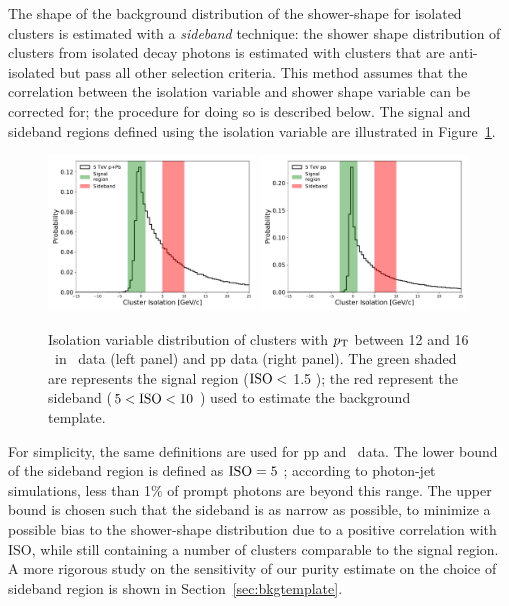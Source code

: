 The shape of the background distribution of the shower-shape for isolated clusters is estimated with a \textit{sideband} technique: the shower shape distribution of clusters from isolated decay photons is estimated with clusters that are anti-isolated but pass all other selection criteria. This method assumes that the correlation between the isolation variable and shower shape variable can be corrected for; the procedure for doing so is described below. The signal and sideband regions defined using the isolation variable are illustrated in Figure~\ref{SidebandDefinition}. 

\begin{figure}[hbtp]
\center
\includegraphics[width=0.49\textwidth]{Data_Analysis/Purity/IsolationSideband_limited_Skimmed_13def_root}
\includegraphics[width=0.49\textwidth]{Data_Analysis/Purity/IsolationSideband_limited_Skimmed_17q_root}
\caption{Isolation variable distribution of clusters with $p_{\mathrm{T}}$ between 12 and 16 \GeVc~in \pPb~data (left panel) and pp data (right panel). The green shaded are represents the signal region ($\mathrm{ISO}<$ 1.5 \GeVc); the red represent the sideband ($5<\mathrm{ISO}<10$ \GeVc) used to estimate the background template.}
\label{SidebandDefinition}
\end{figure}

For simplicity, the same definitions are used for pp and \pPb~data. The lower bound of the sideband region is defined as {$\mathrm{ISO}=5$ \GeVc}; according to photon-jet simulations, less than 1$\%$ of prompt photons are beyond this range. The upper bound is chosen such that the sideband is as narrow as possible, to minimize a possible bias to the shower-shape distribution due to a positive correlation with ISO, while still containing a number of clusters comparable to the signal region. A more rigorous study on the sensitivity of our purity estimate on the choice of sideband region is shown in Section~\ref{sec:bkgtemplate}.

